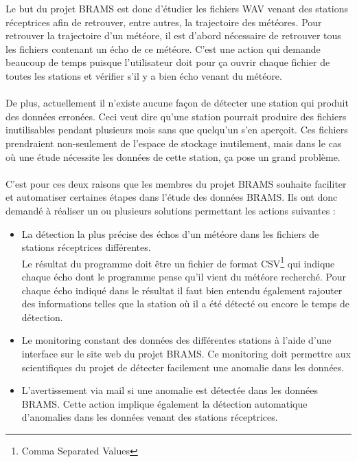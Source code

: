 \documentclass[11pt]{article}
\begin{document}
Le but du projet BRAMS est donc d'étudier les fichiers WAV venant des stations réceptrices afin de retrouver, entre autres, la trajectoire des météores.
Pour retrouver la trajectoire d'un météore, il est d'abord nécessaire de retrouver tous les fichiers contenant un écho de ce météore.
C'est une action qui demande beaucoup de temps puisque l'utilisateur doit pour ça ouvrir chaque fichier de toutes les stations et vérifier s'il y a bien écho venant du météore.\\
\\
De plus, actuellement il n'existe aucune façon de détecter une station qui produit des données erronées.
Ceci veut dire qu'une station pourrait produire des fichiers inutilisables pendant plusieurs mois sans que quelqu'un s'en aperçoit.
Ces fichiers prendraient non-seulement de l'espace de stockage inutilement, mais dans le cas où une étude nécessite les données de cette station, ça pose un grand problème.\\
\\
C'est pour ces deux raisons que les membres du projet BRAMS souhaite faciliter et automatiser certaines étapes dans l'étude des données BRAMS.
Ils ont donc demandé à réaliser un ou plusieurs solutions permettant les actions suivantes :

\begin{itemize}
    \item La détection la plus précise des échos d'un météore dans les fichiers de stations réceptrices différentes.\\
          Le résultat du programme doit être un fichier de format CSV\footnote{Comma Separated Values} qui indique chaque écho dont le programme pense qu'il vient du météore recherché.
          Pour chaque écho indiqué dans le résultat il faut bien entendu également rajouter des informations telles que la station où il a été détecté ou encore le temps de détection.
    \item Le monitoring constant des données des différentes stations à l'aide d'une interface sur le site web du projet BRAMS.
          Ce monitoring doit permettre aux scientifiques du projet de détecter facilement une anomalie dans les données.
    \item L'avertissement via mail si une anomalie est détectée dans les données BRAMS.
          Cette action implique également la détection automatique d'anomalies dans les données venant des stations réceptrices.
\end{itemize}

\newpage
\end{document}
